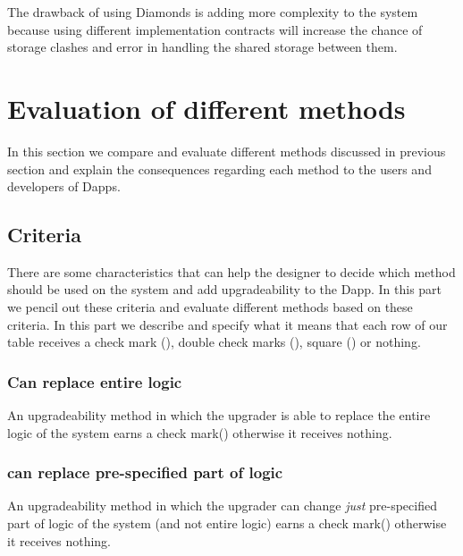 The drawback of using Diamonds is adding more complexity to the system because using different implementation contracts will increase the chance of storage clashes and error in handling the shared storage between them.











 \section{Evaluation of different methods}
 In this section we compare and evaluate different methods discussed in previous section and explain the consequences regarding each method to the users and developers of Dapps.
 \subsection{Criteria}
 There are some characteristics that can help the designer to decide which method should be used on the system and add upgradeability to the Dapp. In this part we pencil out these criteria and evaluate different methods based on these criteria. In this part we describe and specify what it means that each row of our table receives a check mark (\checkmark), double check marks (\checkmark\checkmark), square (\XBox) or nothing. 
 
\subsubsection{Can replace entire logic}
An upgradeability method in which the upgrader is able to replace the entire logic of the system earns a check mark(\checkmark) otherwise it receives nothing.

\subsubsection{can replace pre-specified part of logic}
An upgradeability method in which the upgrader can change \emph{just} pre-specified part of logic of the system (and not entire logic) earns a check mark(\checkmark) otherwise it receives nothing.

